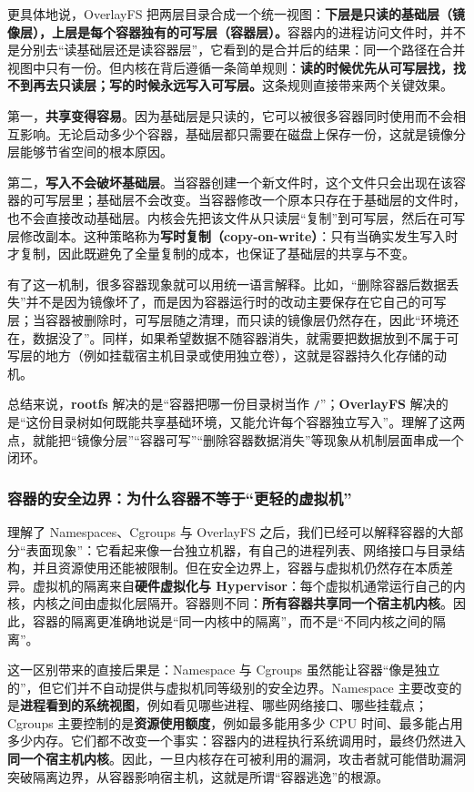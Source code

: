 更具体地说，OverlayFS 把两层目录合成一个统一视图：\textbf{下层是只读的基础层（镜像层），上层是每个容器独有的可写层（容器层）。}容器内的进程访问文件时，并不是分别去“读基础层还是读容器层”，它看到的是合并后的结果：同一个路径在合并视图中只有一份。但内核在背后遵循一条简单规则：\textbf{读的时候优先从可写层找，找不到再去只读层；写的时候永远写入可写层。}这条规则直接带来两个关键效果。

第一，\textbf{共享变得容易}。因为基础层是只读的，它可以被很多容器同时使用而不会相互影响。无论启动多少个容器，基础层都只需要在磁盘上保存一份，这就是镜像分层能够节省空间的根本原因。

第二，\textbf{写入不会破坏基础层}。当容器创建一个新文件时，这个文件只会出现在该容器的可写层里；基础层不会改变。当容器修改一个原本只存在于基础层的文件时，也不会直接改动基础层。内核会先把该文件从只读层“复制”到可写层，然后在可写层修改副本。这种策略称为\textbf{写时复制（copy-on-write）}：只有当确实发生写入时才复制，因此既避免了全量复制的成本，也保证了基础层的共享与不变。

有了这一机制，很多容器现象就可以用统一语言解释。比如，“删除容器后数据丢失”并不是因为镜像坏了，而是因为容器运行时的改动主要保存在它自己的可写层；当容器被删除时，可写层随之清理，而只读的镜像层仍然存在，因此“环境还在，数据没了”。同样，如果希望数据不随容器消失，就需要把数据放到不属于可写层的地方（例如挂载宿主机目录或使用独立卷），这就是容器持久化存储的动机。

总结来说，\textbf{rootfs} 解决的是“容器把哪一份目录树当作 \texttt{/}”；\textbf{OverlayFS} 解决的是“这份目录树如何既能共享基础环境，又能允许每个容器独立写入”。理解了这两点，就能把“镜像分层”“容器可写”“删除容器数据消失”等现象从机制层面串成一个闭环。

\subsubsection{容器的安全边界：为什么容器不等于“更轻的虚拟机”}

理解了 Namespaces、Cgroups 与 OverlayFS 之后，我们已经可以解释容器的大部分“表面现象”：它看起来像一台独立机器，有自己的进程列表、网络接口与目录结构，并且资源使用还能被限制。但在安全边界上，容器与虚拟机仍然存在本质差异。虚拟机的隔离来自\textbf{硬件虚拟化与 Hypervisor}：每个虚拟机通常运行自己的内核，内核之间由虚拟化层隔开。容器则不同：\textbf{所有容器共享同一个宿主机内核}。因此，容器的隔离更准确地说是“同一内核中的隔离”，而不是“不同内核之间的隔离”。

这一区别带来的直接后果是：Namespace 与 Cgroups 虽然能让容器“像是独立的”，但它们并不自动提供与虚拟机同等级别的安全边界。Namespace 主要改变的是\textbf{进程看到的系统视图}，例如看见哪些进程、哪些网络接口、哪些挂载点；Cgroups 主要控制的是\textbf{资源使用额度}，例如最多能用多少 CPU 时间、最多能占用多少内存。它们都不改变一个事实：容器内的进程执行系统调用时，最终仍然进入\textbf{同一个宿主机内核}。因此，一旦内核存在可被利用的漏洞，攻击者就可能借助漏洞突破隔离边界，从容器影响宿主机，这就是所谓“容器逃逸”的根源。

